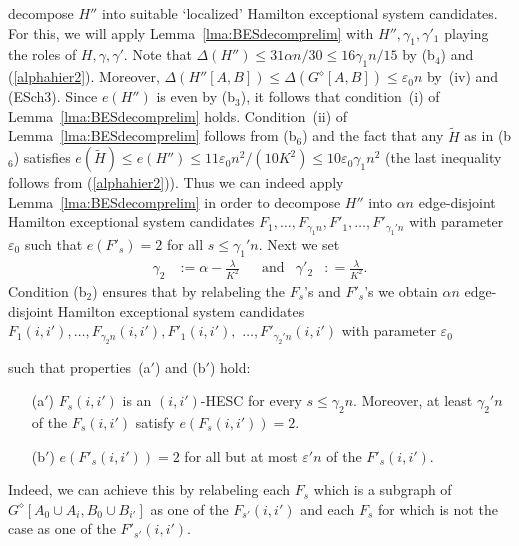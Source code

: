 \documentclass{memo-l}
\def\COMMENT#1{}
\def\eps{\varepsilon}
\numberwithin{section}{chapter}
\numberwithin{equation}{section}
\numberwithin{firstthm}{section}
\numberwithin{figure}{section}
\begin{document}
{decompose $H''$ into suitable `localized' Hamilton exceptional system candidates. For this, we will
apply 
Lemma~\ref{lma:BESdecomprelim} with $H'', \gamma_1,\gamma'_1$ playing the roles of $H, \gamma,\gamma'$.
Note that $\Delta(H'') \le 31 \alpha n/30 \le 16\gamma_1 n/15$ by (b$_4$) and (\ref{alphahier2}).
Moreover, $\Delta(H''[A,B])\le \Delta(G^\diamond[A,B])\le \eps_0 n$ by~(iv) and (ESch3). Since $e(H'')$ is even by (b$_3$), it follows that
condition~(i) of Lemma~\ref{lma:BESdecomprelim} holds. Condition~(ii) of Lemma~\ref{lma:BESdecomprelim}
follows from (b$_6$) and the fact that any $\widetilde{H}$ as in (b$_6$) satisfies
$e(\widetilde{H})\le e(H'') \le 11\eps_0 n^2/(10K^2)\le 10\eps_0\gamma_1 n^2$
(the last inequality follows from (\ref{alphahier2})). Thus we can indeed apply Lemma~\ref{lma:BESdecomprelim}
in order to decompose $H''$ into $ \alpha n $ edge-disjoint Hamilton exceptional system candidates $F_1, \dots , F_{\gamma_1 n}, F'_1, \dots , F'_{\gamma_1 ' n}$
with parameter $\eps_0$ such that $e(F'_s) =2$ for all $s \le \gamma_1' n$. 
Next we set
\begin{align*}
\gamma_2 & := \alpha - \frac{\lambda}{K^2} & 
& \text{and} &
\gamma'_2 & : = \frac{\lambda}{K^2}.
\end{align*}
Condition (b$_2$) ensures that by relabeling the $F_s$'s and $F'_s$'s we obtain $ \alpha n $ edge-disjoint Hamilton exceptional system
candidates $F_1(i,i'), \dots , F_{\gamma_2 n}(i,i'), F'_1(i,i'),$ $ \dots , F'_{\gamma_2 ' n}(i,i')$ with parameter $\eps_0$%
     \COMMENT{Note here that $\gamma_1$ and $\gamma_1'$ are replaced with $\gamma_2$ and $\gamma_2'$ respectively.}
such that properties~(a$'$) and (b$'$) hold:
\begin{itemize}
	\item[(a$'$)] $F_s(i,i')$ is an $(i,i')$-HESC for every $s \le \gamma_2 n$. Moreover, at least $\gamma_2 ' n$ of the $F_s(i,i')$ satisfy $e(F_s(i,i')) = 2$.
	\item[(b$'$)] $e(F'_s(i,i')) = 2$ for all but at most $ \eps' n$ of the $F'_s(i,i')$.
\end{itemize}
Indeed, we can achieve this by relabeling each $F_s$ which is a subgraph of $G^{\diamond}[A_0 \cup A_i, B_0 \cup B_{i'}]$
as one of the $F_{s'}(i,i')$ and each $F_s$ for which is not the case as one of the $F'_{s'}(i,i')$.

}
\end{document}
